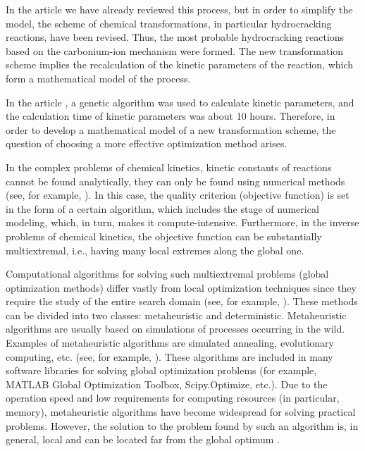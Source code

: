 \documentclass[mathematics,article,submit,pdftex,moreauthors]{Definitions/mdpi}
\begin{document}
In the article \cite{enik2021} we have already reviewed this process, but in order to simplify the model, the scheme of chemical transformations, in particular hydrocracking reactions, have been revised. Thus, the most probable hydrocracking reactions based on the carbonium-ion mechanism were formed. The new transformation scheme implies the recalculation of the kinetic parameters of the reaction, which form a mathematical model of the process.

In the article \cite{enik2021}, a genetic algorithm was used to calculate kinetic parameters, and the calculation time of kinetic parameters was about 10 hours. Therefore, in order to develop a mathematical model of a new transformation scheme, the question of choosing a more effective optimization method arises.

In the complex problems of chemical kinetics, kinetic constants of reactions cannot be found analytically, they can only be found using numerical methods (see, for example, \cite{Zaynullin2020,Enikeeva2020,Koledina2019}). In this case, the quality criterion (objective function) is set in the form of a certain algorithm, which includes the stage of numerical modeling, which, in turn, makes it compute-intensive. Furthermore, in the inverse problems of chemical kinetics, the objective function can be substantially multiextremal, i.e., having many local extremes along the global one. 

Computational algorithms for solving such multiextremal problems (global optimization methods) differ vastly from local optimization techniques since they require the study of the entire search domain (see, for example, \cite{PaulaviciusZilinskas2014,Sergeyev2017}). These methods can be divided into two classes: metaheuristic and deterministic. Metaheuristic algorithms are usually based on simulations of processes occurring in the wild.
Examples of metaheuristic algorithms are simulated annealing, evolutionary computing, etc. (see, for example, \cite{Battiti2009,Eiben2015}).
These algorithms are included in many software libraries for solving global optimization problems (for example, MATLAB Global Optimization Toolbox, Scipy.Optimize, etc.).
Due to the operation speed and low requirements for computing resources (in particular, memory), metaheuristic algorithms have become widespread for solving practical problems. However, the solution to the problem found by such an algorithm is, in general, local and can be located far from the global optimum \cite{Kvasov2018}. 
\end{document}
